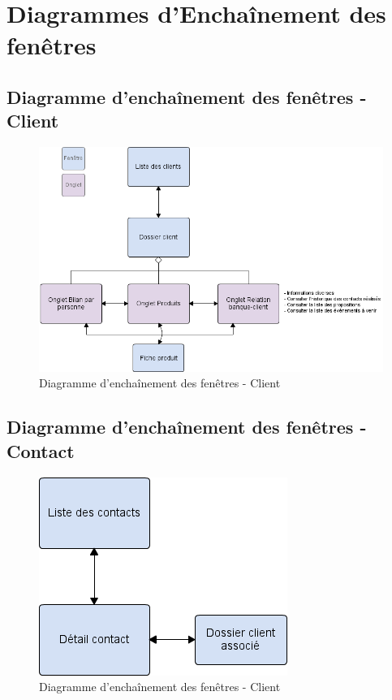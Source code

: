 \section{Diagrammes d'Enchaînement des fenêtres}

\subsection{Diagramme d'enchaînement des fenêtres - Client} 

\begin{figure}[H]
	\begin{center}
		\includegraphics[scale=0.6]{EDF/Client.png}
		\caption{Diagramme d'enchaînement des fenêtres - Client}
	\end{center}
\end{figure}

\subsection{Diagramme d'enchaînement des fenêtres - Contact} 

\begin{figure}[H]
	\begin{center}
		\includegraphics[scale=0.6]{EDF/Contact.png}
		\caption{Diagramme d'enchaînement des fenêtres - Client}
	\end{center}
\end{figure}

